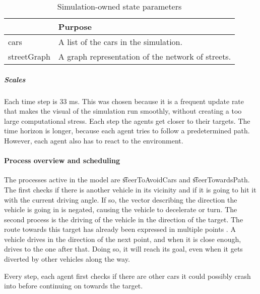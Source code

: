 	\begin{table}[H]
		\centering
		\begin{tabular}{| >{\ttfamily}l | p{10.5cm} |}
			\hline
			\normalfont{Parameter}	& Purpose \\ \hline \hline
			cars 					& A list of the cars in the simulation. \\ \hline
			streetGraph		 		& A graph representation of the network of streets. \\ \hline
		\end{tabular}
		\caption{Simulation-owned state parameters}
		\label{tab:par:method:model:overview:state:highlevel:sim}
	\end{table}


	\subparagraph{Scales}


	Each time step is 33 ms. This was chosen because it is a frequent update rate that makes the visual of the simulation run smoothly, without creating a too large computational stress. Each step the agents get closer to their targets. The time horizon is longer, because each agent tries to follow a predetermined path. However, each agent also has to react to the environment. 



\paragraph{Process overview and scheduling}
\label{par:method:model:overview:process}

The processes active in the model are \t{steerToAvoidCars} and \t{steerTowardsPath}. 
The first checks if there is another vehicle in its vicinity and if it is going to hit it with the current driving angle. If so, the vector describing the direction the vehicle is going in is negated, causing the vehicle to decelerate or turn.
The second process is the driving of the vehicle in the direction of the target. The route towards this target has already been expressed in multiple points . A vehicle drives in the direction of the next point, and when it is close enough, drives to the one after that. Doing so, it will reach its goal, even when it gets diverted by other vehicles along the way.

Every step, each agent first checks if there are other cars it could possibly crash into before continuing on towards the target. 

